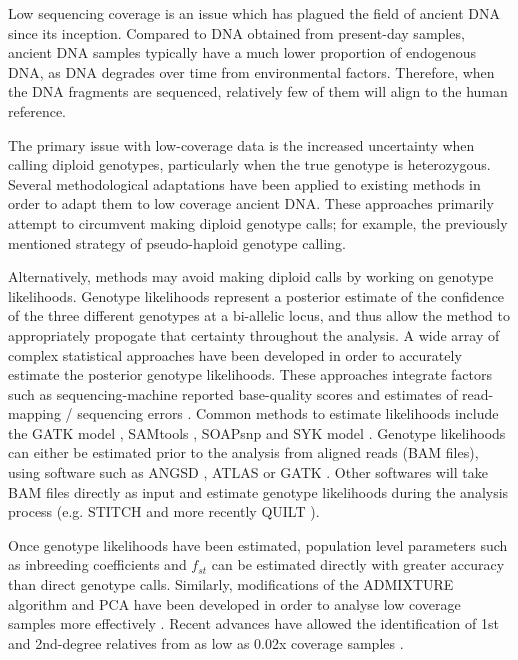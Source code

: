 Low sequencing coverage is an issue which has plagued the field of ancient DNA since its inception. Compared to DNA obtained from present-day samples, ancient DNA samples typically have a much lower proportion of endogenous DNA, as DNA degrades over time from environmental factors. Therefore, when the DNA fragments are sequenced, relatively few of them will align to the human reference. 

The primary issue with low-coverage data is the increased uncertainty when calling diploid genotypes, particularly when the true genotype is heterozygous. Several methodological adaptations have been applied to existing methods in order to adapt them to low coverage ancient DNA. These approaches primarily attempt to circumvent making diploid genotype calls; for example, the previously mentioned strategy of pseudo-haploid genotype calling.

Alternatively, methods may avoid making diploid calls by working on genotype likelihoods. Genotype likelihoods represent a posterior estimate of the confidence of the three different genotypes at a bi-allelic locus, and thus allow the method to appropriately propogate that certainty throughout the analysis. A wide array of complex statistical approaches have been developed in order to accurately estimate the posterior genotype likelihoods. These approaches integrate factors such as sequencing-machine reported base-quality scores and estimates of read-mapping / sequencing errors \cite{McKenna2010}. Common methods to estimate likelihoods include the GATK model \cite{VanderAuwera2013}, SAMtools \cite{Li2009}, SOAPsnp \cite{Li2009a} and SYK model \cite{Kim2011}. Genotype likelihoods can either be estimated prior to the analysis from aligned reads (BAM files), using software such as ANGSD \cite{Korneliussen2014}, ATLAS \cite{Link2017} or GATK \cite{VanderAuwera2013}. Other softwares will take BAM files directly as input and estimate genotype likelihoods during the analysis process (e.g. STITCH \cite{Davies2016} and more recently QUILT \cite{davies2021rapid}). 

Once genotype likelihoods have been estimated, population level parameters such as inbreeding coefficients and $f_{st}$ can be estimated directly \cite{Korneliussen2014} with greater accuracy than direct genotype calls. Similarly, modifications of the ADMIXTURE \cite{Alexander2009} algorithm and PCA have been developed in order to analyse low coverage samples more effectively \cite{skotte2013estimating, zhang2021novel}. Recent advances have allowed the identification of 1st and 2nd-degree relatives from as low as 0.02x coverage samples \cite{fernandes2017identification, fernandes2021tkgwv2}. 

